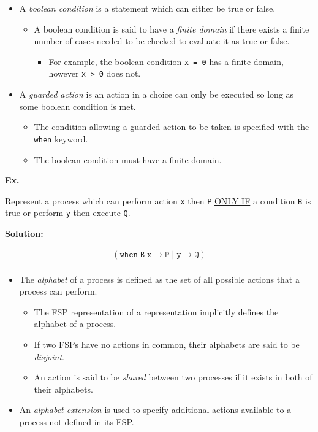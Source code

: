 \documentclass{article}
\newenvironment{example}[1][]{
	\vspace{1em}
	\large{\par\noindent\textbf{Ex.}}
}{\vspace{2.5em}}
\newenvironment{solution}[1][]{
	\par\noindent\textbf{\large{Solution:}}
	\par
	\vspace{1.5em}
}{\vspace{.5em}}
\begin{document}
\begin{itemize}
	\item A \emph{boolean condition} is a statement which can either be true or false.
	\begin{itemize}
		\item A boolean condition is said to have a \emph{finite domain} if there exists a finite number of cases needed to be checked to evaluate it as true or false.
		\begin{itemize}
			\item For example, the boolean condition \texttt{x = 0} has a finite domain, however \texttt{x > 0} does not.
		\end{itemize}
	\end{itemize}
	\item A \emph{guarded action} is an action in a choice can only be executed so long as some boolean condition is met.
	\begin{itemize}
		\item The condition allowing a guarded action to be taken is specified with the \texttt{when} keyword.
		\item The boolean condition must have a finite domain.
	\end{itemize}
\end{itemize}

\begin{example}
	Represent a process which can perform action \texttt{x} then \texttt{P} \underline{ONLY IF} a condition \texttt{B} is true or perform \texttt{y} then execute \texttt{Q}.
\end{example}

\begin{solution}
	\begin{align*}
		(\mathtt{when} \; \mathtt{B} \; \mathtt{x} \rightarrow \mathtt{P} \; | \; \mathtt{y} \rightarrow \texttt{Q}) \\
	\end{align*}
\end{solution}

\begin{itemize}
	\item The \emph{alphabet} of a process is defined as the set of all possible actions that a process can perform.
	\begin{itemize}
		\item The FSP representation of a representation implicitly defines the alphabet of a process.
		\item If two FSPs have no actions in common, their alphabets are said to be \emph{disjoint}.
		\item An action is said to be \emph{shared} between two processes if it exists in both of their alphabets.
	\end{itemize}
	\item An \emph{alphabet extension} is used to specify additional actions available to a process not defined in its FSP.
\end{itemize}
\end{document}
